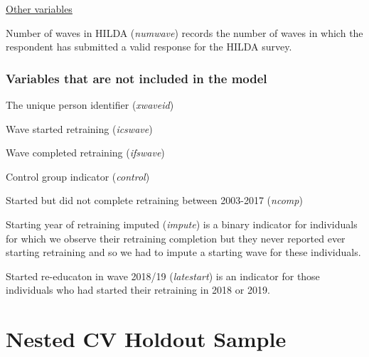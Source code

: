 \documentclass[12pt, a4paper]{article}
\begin{document}
\underline{Other variables}

Number of waves in HILDA (\textit{numwave}) records the number of waves in which the respondent has submitted a valid response for the HILDA survey. 

\subsubsection{Variables that are not included in the model}

The unique person identifier (\textit{xwaveid})

Wave started retraining (\textit{icswave}) 

Wave completed retraining (\textit{ifswave}) 

Control group indicator (\textit{control}) 

Started but did not complete retraining between 2003-2017 (\textit{ncomp}) 

Starting year of retraining imputed (\textit{impute}) is a binary indicator for individuals for which we observe their retraining completion but they never reported ever starting retraining and so we had to impute a starting wave for these individuals.  

Started re-educaton in wave 2018/19 (\textit{latestart}) is an indicator for those individuals who had started their retraining in 2018 or 2019. 


\section{Nested CV Holdout Sample}
\label{app:cv}


\end{document}
